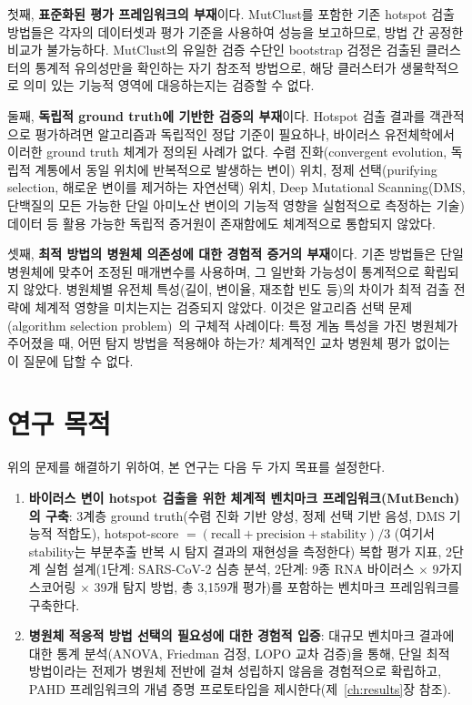 첫째, \textbf{표준화된 평가 프레임워크의 부재}이다.
MutClust를 포함한 기존 hotspot 검출 방법들은 각자의 데이터셋과 평가 기준을 사용하여 성능을 보고하므로, 방법 간 공정한 비교가 불가능하다.
MutClust의 유일한 검증 수단인 bootstrap 검정은 검출된 클러스터의 통계적 유의성만을 확인하는 자기 참조적 방법으로, 해당 클러스터가 생물학적으로 의미 있는 기능적 영역에 대응하는지는 검증할 수 없다.

둘째, \textbf{독립적 ground truth에 기반한 검증의 부재}이다.
Hotspot 검출 결과를 객관적으로 평가하려면 알고리즘과 독립적인 정답 기준이 필요하나, 바이러스 유전체학에서 이러한 ground truth 체계가 정의된 사례가 없다.
수렴 진화(convergent evolution, 독립적 계통에서 동일 위치에 반복적으로 발생하는 변이) 위치, 정제 선택(purifying selection, 해로운 변이를 제거하는 자연선택) 위치, Deep Mutational Scanning(DMS, 단백질의 모든 가능한 단일 아미노산 변이의 기능적 영향을 실험적으로 측정하는 기술) 데이터 등 활용 가능한 독립적 증거원이 존재함에도 체계적으로 통합되지 않았다.

셋째, \textbf{최적 방법의 병원체 의존성에 대한 경험적 증거의 부재}이다.
기존 방법들은 단일 병원체에 맞추어 조정된 매개변수를 사용하며, 그 일반화 가능성이 통계적으로 확립되지 않았다.
병원체별 유전체 특성(길이, 변이율, 재조합 빈도 등)의 차이가 최적 검출 전략에 체계적 영향을 미치는지는 검증되지 않았다.
이것은 알고리즘 선택 문제(algorithm selection problem)~\cite{rice1976algorithm}의 구체적 사례이다: 특정 게놈 특성을 가진 병원체가 주어졌을 때, 어떤 탐지 방법을 적용해야 하는가? 체계적인 교차 병원체 평가 없이는 이 질문에 답할 수 없다.


\section{연구 목적}
\label{sec:intro_objectives}

위의 문제를 해결하기 위하여, 본 연구는 다음 두 가지 목표를 설정한다.

\begin{enumerate}[label=\textbf{목표 \arabic*.}]
  \item \textbf{바이러스 변이 hotspot 검출을 위한 체계적 벤치마크 프레임워크(MutBench)의 구축}: 3계층 ground truth(수렴 진화 기반 양성, 정제 선택 기반 음성, DMS 기능적 적합도), hotspot-score $= (\text{recall} + \text{precision} + \text{stability}) / 3$ (여기서 stability는 부분추출 반복 시 탐지 결과의 재현성을 측정한다) 복합 평가 지표, 2단계 실험 설계(1단계: SARS-CoV-2 심층 분석, 2단계: 9종 RNA 바이러스 $\times$ 9가지 스코어링 $\times$ 39개 탐지 방법, 총 3,159개 평가)를 포함하는 벤치마크 프레임워크를 구축한다.

  \item \textbf{병원체 적응적 방법 선택의 필요성에 대한 경험적 입증}: 대규모 벤치마크 결과에 대한 통계 분석(ANOVA, Friedman 검정, LOPO 교차 검증)을 통해, 단일 최적 방법이라는 전제가 병원체 전반에 걸쳐 성립하지 않음을 경험적으로 확립하고, PAHD 프레임워크의 개념 증명 프로토타입을 제시한다(제~\ref{ch:results}장 참조).
\end{enumerate}



